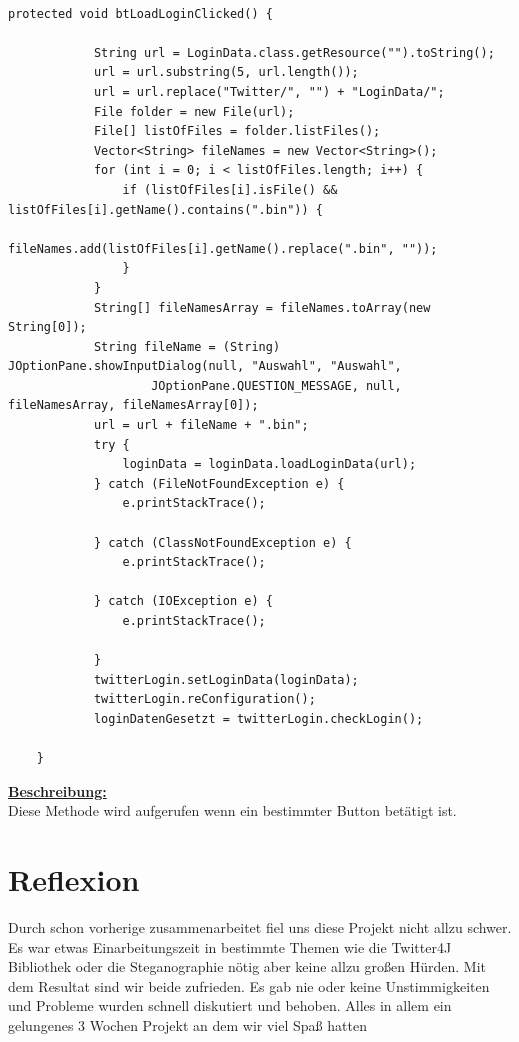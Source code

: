 \documentclass[11pt]{article}
\begin{document}
\begin{lstlisting}[frame=single]  % Start your code-block

protected void btLoadLoginClicked() {
			
			String url = LoginData.class.getResource("").toString();
			url = url.substring(5, url.length());
			url = url.replace("Twitter/", "") + "LoginData/";
			File folder = new File(url);
			File[] listOfFiles = folder.listFiles();
			Vector<String> fileNames = new Vector<String>();
			for (int i = 0; i < listOfFiles.length; i++) {
				if (listOfFiles[i].isFile() && listOfFiles[i].getName().contains(".bin")) {
					fileNames.add(listOfFiles[i].getName().replace(".bin", ""));
				}
			}
			String[] fileNamesArray = fileNames.toArray(new String[0]);
			String fileName = (String) JOptionPane.showInputDialog(null, "Auswahl", "Auswahl",
					JOptionPane.QUESTION_MESSAGE, null, fileNamesArray, fileNamesArray[0]);
			url = url + fileName + ".bin";
			try {
				loginData = loginData.loadLoginData(url);
			} catch (FileNotFoundException e) {
				e.printStackTrace();

			} catch (ClassNotFoundException e) {
				e.printStackTrace();

			} catch (IOException e) {
				e.printStackTrace();

			}
			twitterLogin.setLoginData(loginData);
			twitterLogin.reConfiguration();
			loginDatenGesetzt = twitterLogin.checkLogin();
	
	}

\end{lstlisting}

\underline{\textbf{Beschreibung:}}\\
Diese Methode wird aufgerufen wenn ein bestimmter Button betätigt ist.\\


\newpage
\section{Reflexion}

Durch schon vorherige zusammenarbeitet fiel uns diese Projekt nicht allzu schwer. Es war etwas Einarbeitungszeit in bestimmte Themen wie die Twitter4J Bibliothek oder die Steganographie nötig aber keine allzu großen Hürden. Mit dem Resultat sind wir beide zufrieden. Es gab nie oder keine Unstimmigkeiten und Probleme wurden schnell diskutiert und behoben. Alles in allem ein gelungenes 3 Wochen Projekt an dem wir viel Spaß hatten
\end{document}
